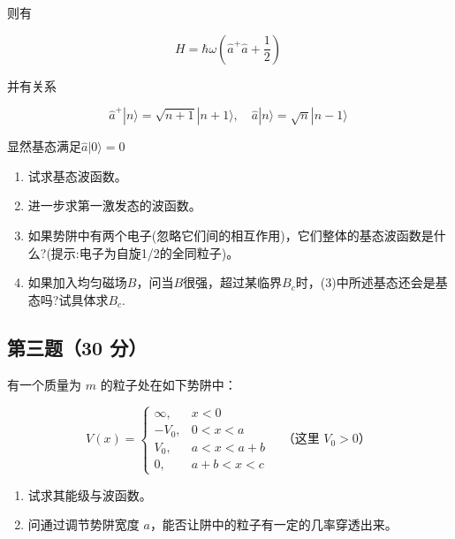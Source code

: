 则有

\[
H = \hbar \omega \left( \hat{a}^+ \hat{a} + \frac{1}{2} \right)~
\]

并有关系

\[
\hat{a}^+ |n\rangle = \sqrt{n+1} |n+1\rangle, \quad
\hat{a} |n\rangle = \sqrt{n} |n-1\rangle~
\]

显然基态满足$\hat{a} |0\rangle = 0$

\begin{enumerate}
    \item 试求基态波函数。
    \item 进一步求第一激发态的波函数。
    \item 如果势阱中有两个电子(忽略它们间的相互作用)，它们整体的基态波函数是什么?(提示:电子为自旋1/2的全同粒子)。
    \item 如果加入均匀磁场$B$，问当$B$很强，超过某临界$B_c$时，(3)中所述基态还会是基态吗?试具体求$B_c$.
\end{enumerate}
\subsection{第三题（30 分）}
有一个质量为 $m$ 的粒子处在如下势阱中：

\[
V(x) =
\begin{cases}
\infty, & x < 0 \\
-V_0, & 0 < x < a \\
V_0, & a < x < a + b \\
0, & a + b < x < c
\end{cases}
\quad \text{（这里 } V_0 > 0\text{）}~
\]

\begin{enumerate}
    \item 试求其能级与波函数。
    \item 问通过调节势阱宽度 $a$，能否让阱中的粒子有一定的几率穿透出来。
\end{enumerate}